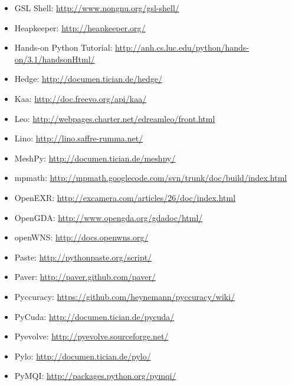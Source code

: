 \documentclass[letterpaper,10pt,english]{sphinxmanual}
\begin{document}
\begin{itemize}
\item {} 
GSL Shell: \url{http://www.nongnu.org/gsl-shell/}

\item {} 
Heapkeeper: \url{http://heapkeeper.org/}

\item {} 
Hands-on Python Tutorial:
\url{http://anh.cs.luc.edu/python/hands-on/3.1/handsonHtml/}

\item {} 
Hedge: \url{http://documen.tician.de/hedge/}

\item {} 
Kaa: \url{http://doc.freevo.org/api/kaa/}

\item {} 
Leo: \url{http://webpages.charter.net/edreamleo/front.html}

\item {} 
Lino: \url{http://lino.saffre-rumma.net/}

\item {} 
MeshPy: \url{http://documen.tician.de/meshpy/}

\item {} 
mpmath: \url{http://mpmath.googlecode.com/svn/trunk/doc/build/index.html}

\item {} 
OpenEXR: \url{http://excamera.com/articles/26/doc/index.html}

\item {} 
OpenGDA: \url{http://www.opengda.org/gdadoc/html/}

\item {} 
openWNS: \url{http://docs.openwns.org/}

\item {} 
Paste: \url{http://pythonpaste.org/script/}

\item {} 
Paver: \url{http://paver.github.com/paver/}

\item {} 
Pyccuracy: \url{https://github.com/heynemann/pyccuracy/wiki/}

\item {} 
PyCuda: \url{http://documen.tician.de/pycuda/}

\item {} 
Pyevolve: \url{http://pyevolve.sourceforge.net/}

\item {} 
Pylo: \url{http://documen.tician.de/pylo/}

\item {} 
PyMQI: \url{http://packages.python.org/pymqi/}


\end{itemize}
\end{document}
